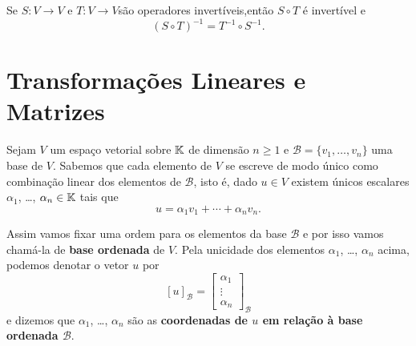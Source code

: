 \begin{proposicao}
    Se $S \colon V \to V$ e $T \colon V \to V$são operadores invertíveis,então $S \circ T$ é invertível e
    \[
      (S \circ T)^{-1}= T^{-1}\circ S^{-1}.
    \]
\end{proposicao}

\section{Transformações Lineares e Matrizes} %
\label{sec:transformacoes_lineares_e_matrizes}

Sejam $V$ um espaço vetorial sobre $\mathbb{K}$ de dimensão $n \ge 1$ e $\mathcal{B} = \{v_1,\dots,v_n\}$ uma base de $V$. Sabemos que cada elemento de $V$ se escreve de modo único como combinação linear dos elementos de $\mathcal{B}$, isto é, dado $u \in V$ existem únicos escalares $\alpha_1$, \dots, $\alpha_n \in \mathbb{K}$ tais que
\[
    u = \alpha_1v_1 + \cdots + \alpha_nv_n.
\]

Assim vamos fixar uma ordem para os elementos da base $\mathcal{B}$ e por isso vamos chamá-la de \textbf{base ordenada} de $V$. Pela unicidade dos elementos $\alpha_1$, \dots, $\alpha_n$ acima, podemos denotar o vetor $u$ por
\[
    [u]_\mathcal{B} = \begin{bmatrix}
    \alpha_1\\
    \vdots\\
    \alpha_n
    \end{bmatrix}_\mathcal{B}
\]
e dizemos que $\alpha_1$, \dots, $\alpha_n$ são as \textbf{coordenadas de $u$ em relação \`a base ordenada $\mathcal{B}$}.

